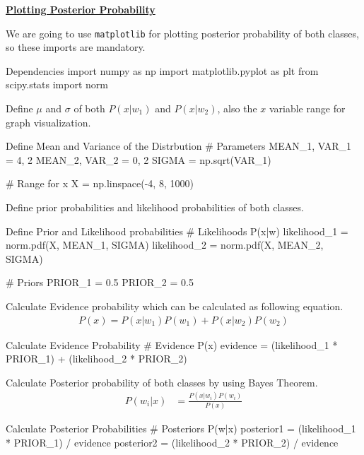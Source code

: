 \documentclass[12pt, a4paper]{article}
\begin{document}
    \pagebreak

            \noindent\underline{\textbf{Plotting Posterior Probability}}
            \vspace{0.5em}

            We are going to use \texttt{matplotlib} for plotting posterior probability of both classes, so these imports are mandatory.
            \begin{codeblock}{Dependencies}
                import numpy as np
                import matplotlib.pyplot as plt
                from scipy.stats import norm
            \end{codeblock}

            Define $\mu$ and $\sigma$ of both $P(x|w_1)$ and $P(x|w_2)$, also the $x$ variable range for graph visualization.
            \begin{codeblock}{Define Mean and Variance of the Distrbution}
                # Parameters
                MEAN_1, VAR_1 = 4, 2
                MEAN_2, VAR_2 = 0, 2
                SIGMA = np.sqrt(VAR_1)

                # Range for x
                X = np.linspace(-4, 8, 1000)
            \end{codeblock}

            Define prior probabilities and likelihood probabilities of both classes.
            \begin{codeblock}{Define Prior and Likelihood probabilities}
                # Likelihoods P(x|w)
                likelihood_1 = norm.pdf(X, MEAN_1, SIGMA)
                likelihood_2 = norm.pdf(X, MEAN_2, SIGMA)

                # Priors
                PRIOR_1 = 0.5
                PRIOR_2 = 0.5
            \end{codeblock}

            Calculate Evidence probability which can be calculated as following equation.
            \begin{align*}
                P(x) = P(x|w_1)P(w_1) + P(x|w_2)P(w_2)
            \end{align*}
            \begin{codeblock}{Calculate Evidence Probability}
                # Evidence P(x)
                evidence = (likelihood_1 * PRIOR_1) + (likelihood_2 * PRIOR_2)
            \end{codeblock}

            Calculate Posterior probability of both classes by using Bayes Theorem.
            \begin{align*}
                P(w_i|x) &= \frac{P(x|w_i)P(w_i)}{P(x)}
            \end{align*}
            \begin{codeblock}{Calculate Posterior Probabilities}
                # Posteriors P(w|x)
                posterior1 = (likelihood_1 * PRIOR_1) / evidence
                posterior2 = (likelihood_2 * PRIOR_2) / evidence
            \end{codeblock}
\end{document}
